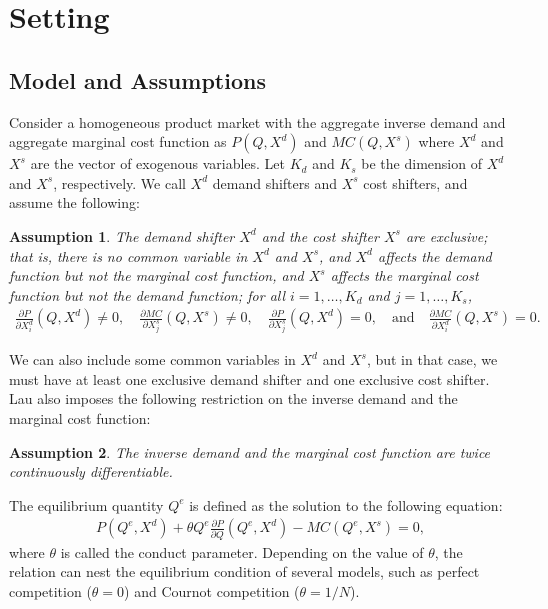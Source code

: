 \documentclass[11pt, a4paper]{article}
\newtheorem{assumption}{Assumption}
\theoremstyle{remark}
\begin{document}
\section{Setting}\label{sec:setting}

\subsection{Model and Assumptions}

Consider a homogeneous product market with the aggregate inverse demand and aggregate marginal cost function as $P(Q, X^{d})$ and $MC(Q, X^{s})$ where $X^{d}$ and $X^{s}$ are the vector of exogenous variables.
Let $K_d$ and $K_s$ be the dimension of $X^{d}$ and $X^{s}$, respectively.
We call $X^{d}$ demand shifters and $X^{s}$ cost shifters, and assume the following:
\begin{assumption}\label{assumption:exclusive_shifters}
    The demand shifter $X^{d}$ and the cost shifter $X^{s}$ are exclusive; that is, there is no common variable in $X^{d}$ and $X^{s}$, and $X^{d}$ affects the demand function but not the marginal cost function, and $X^{s}$ affects the marginal cost function but not the demand function; for all $i = 1, \ldots, K_d$ and $j = 1, \ldots, K_s$,
    \begin{align}
        \frac{\partial P}{\partial X^{d}_{i}}(Q, X^{d}) \ne 0, \quad \frac{\partial MC}{\partial X^{s}_{j}}(Q, X^{s}) \ne 0, \quad \frac{\partial P}{\partial X^{s}_{j}}(Q, X^{d}) = 0, \quad \text{and} \quad \frac{\partial MC}{\partial X^{d}_{i}}(Q, X^{s}) = 0.
    \end{align}
\end{assumption}
We can also include some common variables in $X^{d}$ and $X^{s}$, but in that case, we must have at least one exclusive demand shifter and one exclusive cost shifter.
Lau also imposes the following restriction on the inverse demand and the marginal cost function:
\begin{assumption}\label{assumption:twice_differentiable}
    The inverse demand and the marginal cost function are twice continuously differentiable.
\end{assumption}

The equilibrium quantity $Q^e$ is defined as the solution to the following equation:
\begin{align}
    P(Q^e, X^{d}) + \theta Q^e\frac{\partial P}{\partial Q}(Q^e, X^{d}) - MC(Q^e, X^{s}) = 0, \label{eq:foc}
\end{align}
where $\theta$ is called the conduct parameter.
Depending on the value of $\theta$, the relation can nest the equilibrium condition of several models, such as perfect competition ($\theta=0$) and Cournot competition ($\theta=1/N$).
\end{document}
